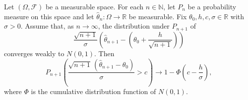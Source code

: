 \begin{theorem}
Let $(\Omega,\mathcal F)$ be a measurable space. For each $n\in\mathbb N$,
let $P_n$ be a probability measure on this space and let
$\widehat\theta_n:\Omega\to\mathbb R$ be measurable. Fix
$\theta_0,h,c,\sigma\in\mathbb R$ with $\sigma>0$. Assume that, as
$n\to\infty$, the distribution under $P_{n+1}$ of
\[
 \frac{\sqrt{n+1}}{\sigma}
 \left(\widehat\theta_{n+1}-
 \left(\theta_0+\frac{h}{\sqrt{n+1}}\right)\right)
\]
converges weakly to $N(0,1)$. Then
\[
 P_{n+1}\!\left(
 \frac{\sqrt{n+1}\,(\widehat\theta_{n+1}-\theta_0)}{\sigma}>c
 \right)
 \longrightarrow
 1-\Phi\!\left(c-\frac{h}{\sigma}\right),
\]
where $\Phi$ is the cumulative distribution function of $N(0,1)$.
\end{theorem}
